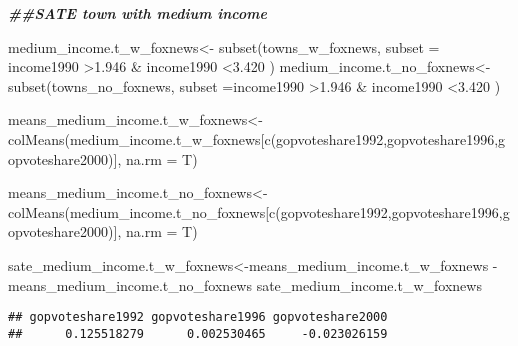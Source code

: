 \documentclass[
]{article}
\newenvironment{Shaded}{\begin{snugshade}}{\end{snugshade}}
\newcommand{\AttributeTok}[1]{\textcolor[rgb]{0.77,0.63,0.00}{#1}}
\newcommand{\DocumentationTok}[1]{\textcolor[rgb]{0.56,0.35,0.01}{\textbf{\textit{#1}}}}
\newcommand{\FloatTok}[1]{\textcolor[rgb]{0.00,0.00,0.81}{#1}}
\newcommand{\FunctionTok}[1]{\textcolor[rgb]{0.00,0.00,0.00}{#1}}
\newcommand{\NormalTok}[1]{#1}
\newcommand{\OtherTok}[1]{\textcolor[rgb]{0.56,0.35,0.01}{#1}}
\newcommand{\SpecialCharTok}[1]{\textcolor[rgb]{0.00,0.00,0.00}{#1}}
\newcommand{\StringTok}[1]{\textcolor[rgb]{0.31,0.60,0.02}{#1}}
\begin{document}
\begin{Shaded}
\begin{Highlighting}[]
\DocumentationTok{\#\#SATE town with medium income}

\NormalTok{medium\_income.t\_w\_foxnews}\OtherTok{\textless{}{-}} \FunctionTok{subset}\NormalTok{(towns\_w\_foxnews, }\AttributeTok{subset =}\NormalTok{ income1990 }\SpecialCharTok{\textgreater{}}\FloatTok{1.946} \SpecialCharTok{\&}\NormalTok{ income1990 }\SpecialCharTok{\textless{}}\FloatTok{3.420}\NormalTok{ )}
\NormalTok{medium\_income.t\_no\_foxnews}\OtherTok{\textless{}{-}} \FunctionTok{subset}\NormalTok{(towns\_no\_foxnews, }\AttributeTok{subset =}\NormalTok{income1990 }\SpecialCharTok{\textgreater{}}\FloatTok{1.946} \SpecialCharTok{\&}\NormalTok{ income1990 }\SpecialCharTok{\textless{}}\FloatTok{3.420}\NormalTok{ )}

\NormalTok{means\_medium\_income.t\_w\_foxnews}\OtherTok{\textless{}{-}}\FunctionTok{colMeans}\NormalTok{(medium\_income.t\_w\_foxnews[}\FunctionTok{c}\NormalTok{(}\StringTok{\textquotesingle{}gopvoteshare1992\textquotesingle{}}\NormalTok{,}\StringTok{\textquotesingle{}gopvoteshare1996\textquotesingle{}}\NormalTok{,}\StringTok{\textquotesingle{}gopvoteshare2000\textquotesingle{}}\NormalTok{)], }\AttributeTok{na.rm =}\NormalTok{ T)}

\NormalTok{means\_medium\_income.t\_no\_foxnews}\OtherTok{\textless{}{-}}\FunctionTok{colMeans}\NormalTok{(medium\_income.t\_no\_foxnews[}\FunctionTok{c}\NormalTok{(}\StringTok{\textquotesingle{}gopvoteshare1992\textquotesingle{}}\NormalTok{,}\StringTok{\textquotesingle{}gopvoteshare1996\textquotesingle{}}\NormalTok{,}\StringTok{\textquotesingle{}gopvoteshare2000\textquotesingle{}}\NormalTok{)], }\AttributeTok{na.rm =}\NormalTok{ T)}


\NormalTok{sate\_medium\_income.t\_w\_foxnews}\OtherTok{\textless{}{-}}\NormalTok{means\_medium\_income.t\_w\_foxnews }\SpecialCharTok{{-}}\NormalTok{ means\_medium\_income.t\_no\_foxnews}
\NormalTok{sate\_medium\_income.t\_w\_foxnews}
\end{Highlighting}
\end{Shaded}

\begin{verbatim}
## gopvoteshare1992 gopvoteshare1996 gopvoteshare2000 
##      0.125518279      0.002530465     -0.023026159
\end{verbatim}
\end{document}
